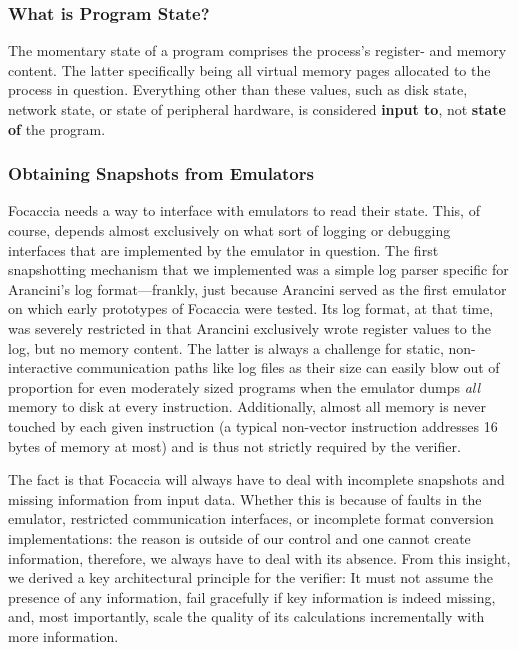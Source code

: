 \subsubsection{What is Program State?}

The momentary state of a program comprises the process's register- and memory content. The latter specifically being all
virtual memory pages allocated to the process in question. Everything other than these values, such as disk state,
network state, or state of peripheral hardware, is considered \textbf{input to}, not \textbf{state of} the program.

\subsubsection{Obtaining Snapshots from Emulators}\label{sec:obtaining_snapshots}

Focaccia needs a way to interface with emulators to read their state. This, of course, depends almost exclusively on
what sort of logging or debugging interfaces that are implemented by the emulator in question. The first snapshotting
mechanism that we implemented was a simple log parser specific for Arancini's log format---frankly, just because
Arancini served as the first emulator on which early prototypes of Focaccia were tested. Its log format, at that time,
was severely restricted in that Arancini exclusively wrote register values to the log, but no memory content. The latter
is always a challenge for static, non-interactive communication paths like log files as their size can easily blow out
of proportion for even moderately sized programs when the emulator dumps \textit{all} memory to disk at every
instruction. Additionally, almost all memory is never touched by each given instruction (a typical non-vector
instruction addresses 16 bytes of memory at most) and is thus not strictly required by the verifier.

The fact is that Focaccia will always have to deal with incomplete snapshots and missing information from input data.
Whether this is because of faults in the emulator, restricted communication interfaces, or incomplete format conversion
implementations: the reason is outside of our control and one cannot create information, therefore, we always have to
deal with its absence. From this insight, we derived a key architectural principle for the verifier: It must not assume
the presence of any information, fail gracefully if key information is indeed missing, and, most importantly, scale the
quality of its calculations incrementally with more information.

